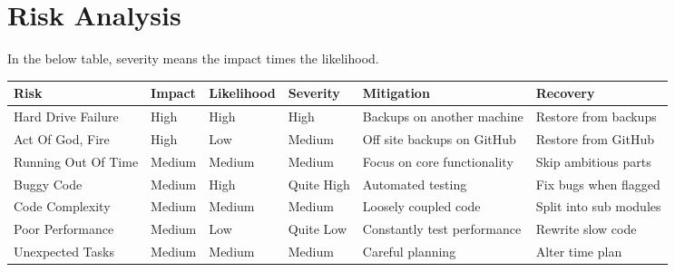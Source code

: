 \section{Risk Analysis}

In the below table, severity means the impact times the likelihood.

\begin{adjustwidth}{-8em}{}
\begin{tabular}{l l l l l l}
\toprule
Risk                & Impact    & Likelihood    & Severity      & Mitigation                    & Recovery              \\
\midrule
Hard Drive Failure  & High      & High          & High          & Backups on another machine    & Restore from backups  \\ \addlinespace
Act Of God, Fire    & High      & Low           & Medium        & Off site backups on GitHub    & Restore from GitHub   \\ \addlinespace
Running Out Of Time & Medium    & Medium        & Medium        & Focus on core functionality   & Skip ambitious parts  \\ \addlinespace
Buggy Code          & Medium    & High          & Quite High    & Automated testing             & Fix bugs when flagged \\ \addlinespace
Code Complexity     & Medium    & Medium        & Medium        & Loosely coupled code          & Split into sub modules\\ \addlinespace
Poor Performance    & Medium    & Low           & Quite Low     & Constantly test performance   & Rewrite slow code     \\ \addlinespace
Unexpected Tasks    & Medium    & Medium        & Medium        & Careful planning              & Alter time plan       \\
\bottomrule
\end{tabular}
\end{adjustwidth}
